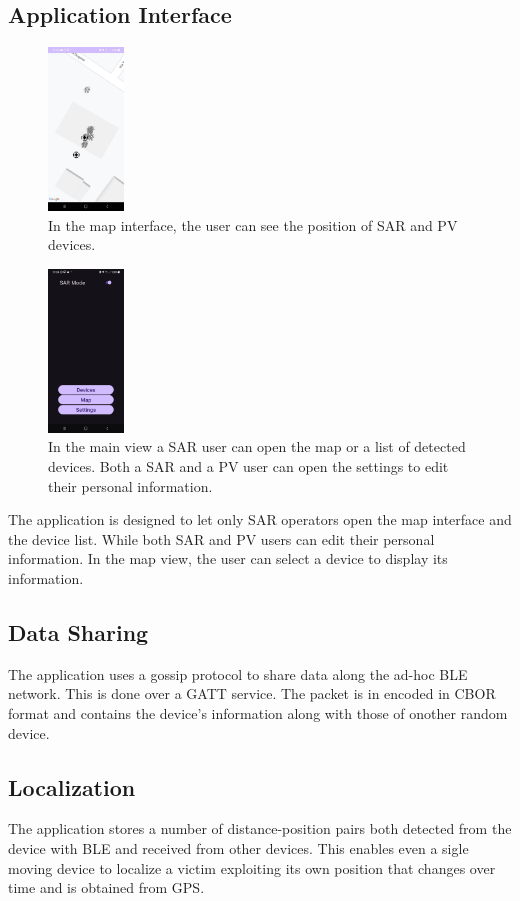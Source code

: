 \documentclass{article}
\begin{document}
\begin{multicols}{2}
\subsection{Application Interface}
\begin{multicols}{2}
\begin{figure}[H]
    \center
    \includegraphics[width=2cm]{fig/map.jpg} 
    \caption{In the map interface, 
    the user can see the position of
    SAR and PV devices.}
\end{figure}
\begin{figure}[H]
    \center
    \includegraphics[width=2cm]{fig/main.jpg}
    \caption{In the main view a SAR user can
    open the map or a list of detected devices.
    Both a SAR and a PV user can open the settings
    to edit their personal information.}
\end{figure}
\end{multicols}
The application is designed to let only SAR 
operators open the map interface and the device
list. While both SAR and PV users can edit their
personal information.
In the map view, the user can select a device to
display its information.
\subsection{Data Sharing}
The application uses a gossip protocol to share
data along the ad-hoc BLE network. This is done 
over a GATT service. The packet is in encoded in
CBOR format and contains the device's information
along with those of onother random device.
\subsection{Localization}
The application stores a number of 
distance-position pairs both detected from the
device with BLE and received from other devices.
This enables even a sigle moving device to
localize a victim exploiting its own position that
changes over time and is obtained from GPS.

\end{multicols}
\end{document}

